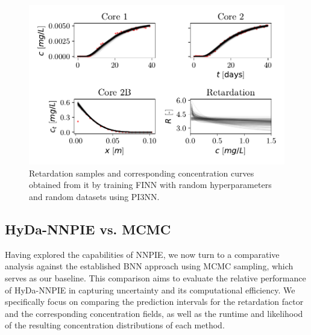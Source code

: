 \begin{figure}[h]
    \centering
    \includegraphics{figs/finn_fullspan_samples.pdf}
    \caption{Retardation samples and corresponding concentration curves obtained from it by training FINN with random hyperparameters and random datasets using PI3NN.}
    \label{fig:fullspan_samples}
\end{figure}



\subsection{HyDa-NNPIE vs. MCMC}
Having explored the capabilities of NNPIE, we now turn to a comparative analysis against the established BNN approach using MCMC sampling, which serves as our baseline. This comparison aims to evaluate the relative performance of HyDa-NNPIE in capturing uncertainty and its computational efficiency. We specifically focus on comparing the prediction intervals for the retardation factor and the corresponding concentration fields, as well as the runtime and likelihood of the resulting concentration distributions of each method.

